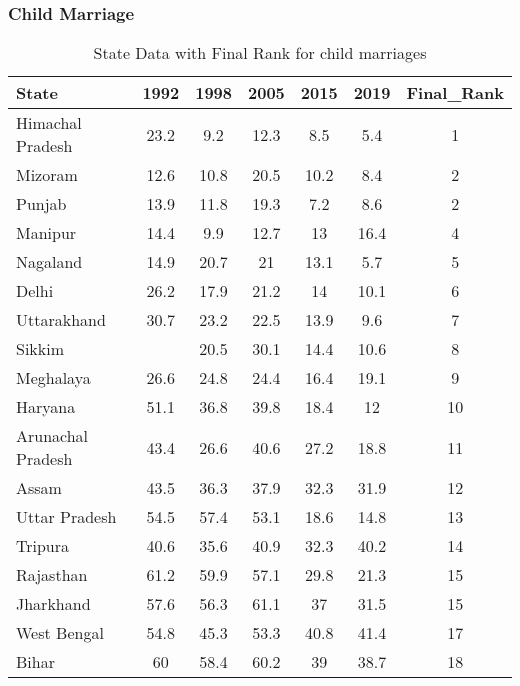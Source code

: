 \subsubsection{Child Marriage}
\begin{table}[h!]
\centering
\begin{tabular}{lcccccc}
\toprule
State             & 1992 & 1998 & 2005 & 2015 & 2019 & Final\_Rank \\
\midrule
Himachal Pradesh  & 23.2 & 9.2  & 12.3 & 8.5  & 5.4  & 1          \\
Mizoram           & 12.6 & 10.8 & 20.5 & 10.2 & 8.4  & 2          \\
Punjab            & 13.9 & 11.8 & 19.3 & 7.2  & 8.6  & 2          \\
Manipur           & 14.4 & 9.9  & 12.7 & 13   & 16.4 & 4          \\
Nagaland          & 14.9 & 20.7 & 21   & 13.1 & 5.7  & 5          \\
Delhi             & 26.2 & 17.9 & 21.2 & 14   & 10.1 & 6          \\
Uttarakhand       & 30.7 & 23.2 & 22.5 & 13.9 & 9.6  & 7          \\
Sikkim            &      & 20.5 & 30.1 & 14.4 & 10.6 & 8          \\
Meghalaya         & 26.6 & 24.8 & 24.4 & 16.4 & 19.1 & 9          \\
Haryana           & 51.1 & 36.8 & 39.8 & 18.4 & 12   & 10         \\
Arunachal Pradesh & 43.4 & 26.6 & 40.6 & 27.2 & 18.8 & 11         \\
Assam             & 43.5 & 36.3 & 37.9 & 32.3 & 31.9 & 12         \\
Uttar Pradesh     & 54.5 & 57.4 & 53.1 & 18.6 & 14.8 & 13         \\
Tripura           & 40.6 & 35.6 & 40.9 & 32.3 & 40.2 & 14         \\
Rajasthan         & 61.2 & 59.9 & 57.1 & 29.8 & 21.3 & 15         \\
Jharkhand         & 57.6 & 56.3 & 61.1 & 37   & 31.5 & 15         \\
West Bengal       & 54.8 & 45.3 & 53.3 & 40.8 & 41.4 & 17         \\
Bihar             & 60   & 58.4 & 60.2 & 39   & 38.7 & 18         \\
\bottomrule
\end{tabular}
\caption{State Data with Final Rank for child marriages}
\label{tab:child_marriage}
\end{table}


